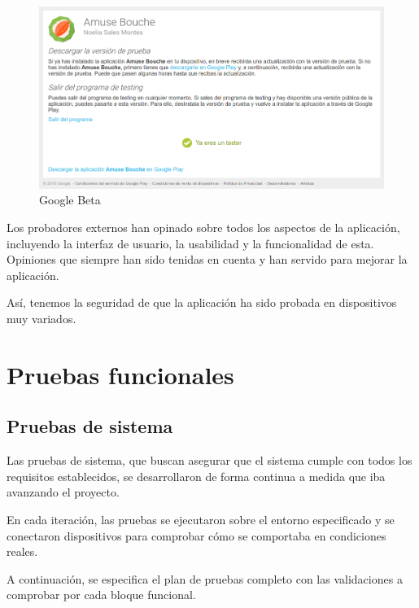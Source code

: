 \begin{figure}[htbp]
  \centering
  \includegraphics[width=\textwidth]{cap7/img/google-beta}
  \caption{Google Beta}
  \label{fig:google-beta}
\end{figure}

Los probadores externos han opinado sobre todos los aspectos de la aplicación,
incluyendo la interfaz de usuario, la usabilidad y la funcionalidad de esta.
Opiniones que siempre han sido tenidas en cuenta y han servido para mejorar
la aplicación.

Así, tenemos la seguridad de que la aplicación ha sido probada en dispositivos
muy variados.


\section{Pruebas funcionales}

\subsection{Pruebas de sistema}

Las pruebas de sistema, que buscan asegurar que el sistema cumple con todos
los requisitos establecidos, se desarrollaron de forma continua a medida que iba
avanzando el proyecto.

En cada iteración, las pruebas se ejecutaron sobre el entorno especificado y se
conectaron dispositivos para comprobar cómo se comportaba en condiciones
reales.

A continuación, se especifica el plan de pruebas completo con las validaciones
a comprobar por cada bloque funcional.

